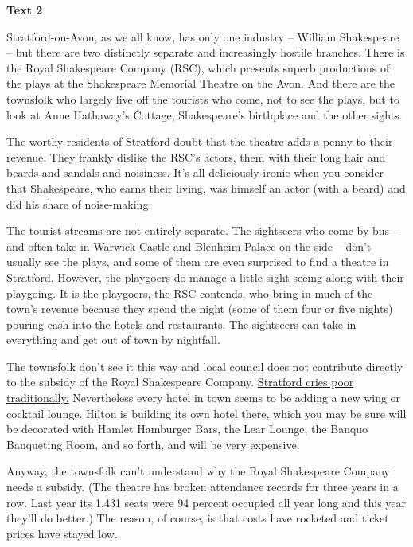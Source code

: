 
\begin{center}\textbf{Text 2}\end{center}

\qquad Stratford-on-Avon, as we all know, has only one industry -- William Shakespeare -- but there are two distinctly separate and increasingly hostile branches. There is the Royal Shakespeare Company (RSC), which presents superb productions of the plays at the Shakespeare Memorial Theatre on the Avon. And there are the townsfolk who largely live off the tourists who come, not to see the plays, but to look at Anne Hathaway's Cottage, Shakespeare's birthplace and the other sights.

\qquad The worthy residents of Stratford doubt that the theatre adds a penny to their revenue. They frankly dislike the RSC's actors, them with their long hair and beards and sandals and noisiness. It's all deliciously ironic when you consider that Shakespeare, who earns their living, was himself an actor (with a beard) and did his share of noise-making.

\qquad The tourist streams are not entirely separate. The sightseers who come by bus -- and often take in Warwick Castle and Blenheim Palace on the side -- don't usually see the plays, and some of them are even surprised to find a theatre in Stratford. However, the playgoers do manage a little sight-seeing along with their playgoing. It is the playgoers, the RSC contends, who bring in much of the town's revenue because they spend the night (some of them four or five nights) pouring cash into the hotels and restaurants. The sightseers can take in everything and get out of town by nightfall.

\qquad The townsfolk don't see it this way and local council does not contribute directly to the subsidy of the Royal Shakespeare Company. \ul{Stratford cries poor traditionally.} Nevertheless every hotel in town seems to be adding a new wing or cocktail lounge. Hilton is building its own hotel there, which you may be sure will be decorated with Hamlet Hamburger Bars, the Lear Lounge, the Banquo Banqueting Room, and so forth, and will be very expensive.

\qquad Anyway, the townsfolk can't understand why the Royal Shakespeare Company needs a subsidy. (The theatre has broken attendance records for three years in a row. Last year its 1,431 seats were 94 percent occupied all year long and this year they'll do better.) The reason, of course, is that costs have rocketed and ticket prices have stayed low.

